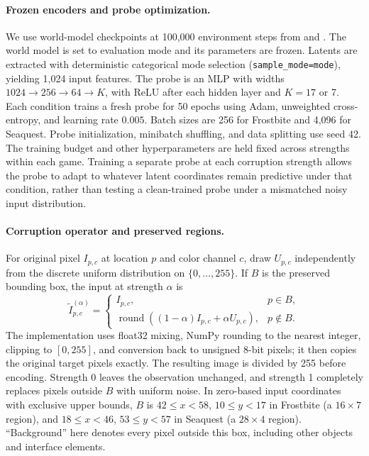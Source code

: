 \documentclass{article} %
\begin{document}
\paragraph{Frozen encoders and probe optimization.}
We use world-model checkpoints at 100,000 environment steps from  and . The world model is set to evaluation mode and its parameters are frozen. Latents are extracted with deterministic categorical mode selection (\texttt{sample\_mode=mode}), yielding 1,024 input features. The probe is an MLP with widths $1024\rightarrow256\rightarrow64\rightarrow K$, with ReLU after each hidden layer and $K=17$ or 7. Each condition trains a fresh probe for 50 epochs using Adam, unweighted cross-entropy, and learning rate $0.005$. Batch sizes are 256 for Frostbite and 4,096 for Seaquest. Probe initialization, minibatch shuffling, and data splitting use seed 42. The training budget and other hyperparameters are held fixed across strengths within each game. Training a separate probe at each corruption strength allows the probe to adapt to whatever latent coordinates remain predictive under that condition, rather than testing a clean-trained probe under a mismatched noisy input distribution.

\paragraph{Corruption operator and preserved regions.}
For original pixel $I_{p,c}$ at location $p$ and color channel $c$, draw $U_{p,c}$ independently from the discrete uniform distribution on $\{0,\ldots,255\}$. If $B$ is the preserved bounding box, the input at strength $\alpha$ is
\begin{equation}
\widetilde I_{p,c}^{(\alpha)} =
\begin{cases}
I_{p,c}, & p\in B,\\
\operatorname{round}\!\left((1-\alpha)I_{p,c}+\alpha U_{p,c}\right), & p\notin B.
\end{cases}
\label{eq:probe_background_noise}
\end{equation}
The implementation uses float32 mixing, NumPy rounding to the nearest integer, clipping to $[0,255]$, and conversion back to unsigned 8-bit pixels; it then copies the original target pixels exactly. The resulting image is divided by 255 before encoding. Strength 0 leaves the observation unchanged, and strength 1 completely replaces pixels outside $B$ with uniform noise. In zero-based input coordinates with exclusive upper bounds, $B$ is $42\leq x<58$, $10\leq y<17$ in Frostbite (a $16\times7$ region), and $18\leq x<46$, $53\leq y<57$ in Seaquest (a $28\times4$ region). ``Background'' here denotes every pixel outside this box, including other objects and interface elements.
\end{document}
